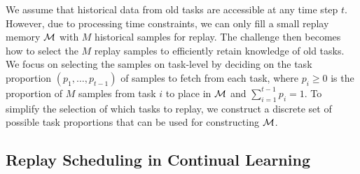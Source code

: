 We assume that historical data from old tasks are accessible at any time step $t$. 
However, due to processing time constraints, we can only fill a small replay memory ${\mathcal{M}}$ with $M$ historical samples for replay. 
The challenge then becomes how to select the $M$ replay samples to efficiently retain knowledge of old tasks. We focus on selecting the samples on task-level by deciding on the task proportion $(p_1, \dots, p_{t-1})$ of samples to fetch from each task, where $p_{i} \geq 0$ is the proportion of $M$ samples from task $i$ to place in ${\mathcal{M}}$ and $\sum_{i=1}^{t-1} p_i = 1$. To simplify the selection of which tasks to replay, we construct a discrete set of possible task proportions that can be used for constructing ${\mathcal{M}}$.



\begin{comment}

\begin{figure}[t]
\centering 
\setlength{\figwidth}{.77\textwidth}
\setlength{\figheight}{.3\textheight}

\vspace{-2mm}
\caption{Tree-shaped action space of possible replay memory compositions with size $M=8$ at every task from the discretization method described in Section \ref{sec:replay_scheduling_in_continual_learning} for Split MNIST. A replay schedule is represented as a path traversal of different replay memory compositions from task 1 to task 5. 
}
\vspace{-3mm}
\label{fig:replay_scheduling_mcts_tree_example}
\end{figure}
	content...
\end{comment}

%
\subsection{Replay Scheduling in Continual Learning}\label{paperC:sec:replay_scheduling_in_continual_learning}


